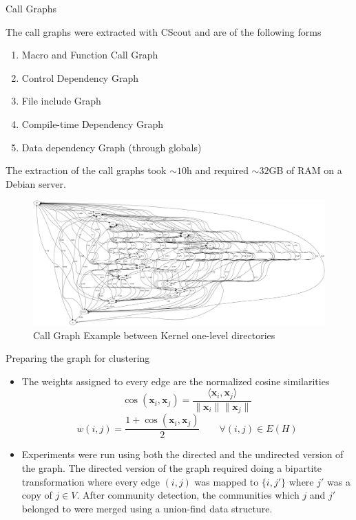 \documentclass{beamer}
\renewcommand{\vec}{\mathbf}
\begin{document}
\begin{frame}[allowframebreaks]{Call Graphs}

The call graphs were extracted with CScout \cite{cscout} and are of the following forms

\begin{enumerate}
    \item Macro and Function Call Graph
    \item Control Dependency Graph 
    \item File include Graph
    \item Compile-time Dependency Graph
    \item Data dependency Graph (through globals)
    
\end{enumerate}

The extraction of the call graphs took $\sim 10$h and required $\sim 32$GB of RAM on a Debian server. 

\framebreak

\begin{figure}
    \centering
    \includegraphics[keepaspectratio,width=0.9\paperwidth,                          height=\paperheight]{call_graph.png}
    \caption{Call Graph Example between Kernel one-level directories}
    \label{fig:my_label}
\end{figure}


\end{frame}

\begin{frame}{Preparing the graph for clustering}

\begin{itemize}
    \item<1-> The weights assigned to every edge are the normalized cosine similarities
    $$\cos(\vec x_i, \vec x_j) = \frac {\langle \vec x_i, \vec x_j \rangle} {\| \vec x_i \| \| \vec x_j \|}$$
    $$w(i, j) = \frac {1 + \cos(\vec x_i, \vec x_j)} {2} \qquad \forall (i, j) \in E(H)$$
    
    \item<2-> Experiments were run using both the directed and the undirected version of the graph. The directed version of the graph required doing a bipartite transformation \cite{malliaros} where every edge $(i, j)$ was mapped to $\{ i, j' \}$ where $j'$ was a copy of $j \in V$. After community detection, the communities which $j$ and $j'$ belonged to were merged using a union-find data structure.  
    
\end{itemize}

\end{frame}
\end{document}
